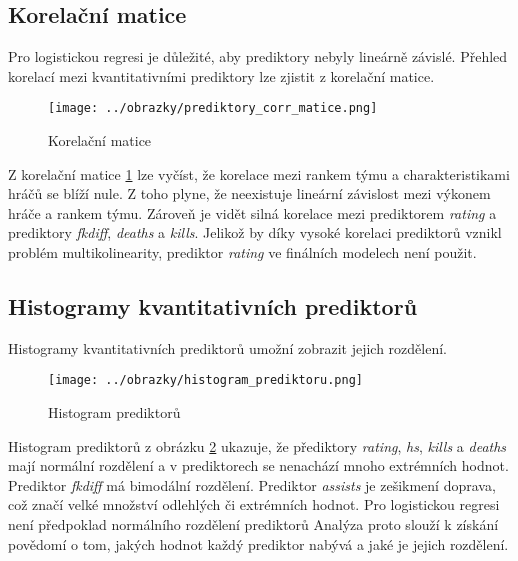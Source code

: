\newpage
\subsection{Korelační matice}
Pro logistickou regresi je důležité, aby prediktory nebyly lineárně závislé. Přehled korelací mezi kvantitativními prediktory lze zjistit z korelační matice.

\begin{figure}[H]
    \centering
    \texttt{[image: ../obrazky/prediktory\_corr\_matice.png]}
    \caption{Korelační matice} 
    \label{fig:korelacni_matice}
\end{figure}

Z korelační matice \ref{fig:korelacni_matice} lze vyčíst, 
{\color{red}
že korelace mezi rankem týmu a charakteristikami hráčů se blíží nule. Z toho plyne, že neexistuje lineární závislost mezi výkonem hráče a 
rankem týmu.
}
Zároveň je vidět silná korelace mezi prediktorem \textit{rating} a prediktory \textit{fkdiff}, \textit{deaths} a \textit{kills}.
{\color{red}
Jelikož by díky vysoké korelaci prediktorů vznikl problém multikolinearity, prediktor \textit{rating} ve finálních modelech není použit.
}

\newpage
\subsection{Histogramy kvantitativních prediktorů}
Histogramy kvantitativních prediktorů umožní zobrazit jejich rozdělení.

\begin{figure}[H]
    \centering
    \texttt{[image: ../obrazky/histogram\_prediktoru.png]}
    \caption{Histogram prediktorů} 
    \label{fig:histogram_prediktoru}
\end{figure}

{\color{red}
Histogram prediktorů z obrázku \ref{fig:histogram_prediktoru} ukazuje, že přediktory \textit{rating}, \textit{hs}, \textit{kills} a \textit{deaths} mají normální rozdělení
a v prediktorech se nenachází mnoho extrémních hodnot.
}
Prediktor \textit{fkdiff} má bimodální rozdělení. Prediktor \textit{assists} je 
{\color{red}
zešikmení
}
doprava, což značí velké množství odlehlých či extrémních hodnot. 
{\color{red}
Pro logistickou regresi není předpoklad normálního rozdělení prediktorů Analýza proto slouží k získání povědomí o tom, 
jakých hodnot každý prediktor nabývá a jaké je jejich rozdělení.
}

